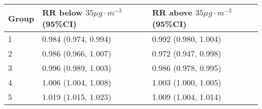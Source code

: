 \begin{tabular}{lll}
  \hline
Group & RR below $35 \mu g \cdot m^{-3}$ (95\%CI) & RR above $35 \mu g \cdot m^{-3}$ (95\%CI) \\ 
  \hline
   1 & 0.984 (0.974, 0.994) & 0.992 (0.980, 1.004) \\ 
     2 & 0.986 (0.966, 1.007) & 0.972 (0.947, 0.998) \\ 
     3 & 0.996 (0.989, 1.003) & 0.986 (0.978, 0.995) \\ 
     4 & 1.006 (1.004, 1.008) & 1.003 (1.000, 1.005) \\ 
     5 & 1.019 (1.015, 1.023) & 1.009 (1.004, 1.014) \\ 
   \hline
\end{tabular}

